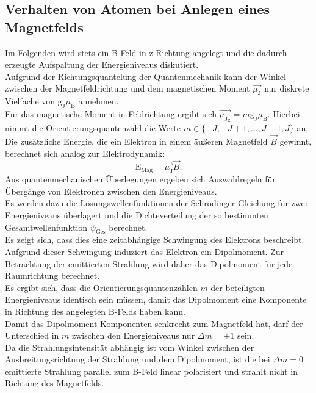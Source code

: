 \subsection{Verhalten von Atomen bei Anlegen eines Magnetfelds}
Im Folgenden wird stets ein B-Feld in z-Richtung angelegt und die dadurch erzeugte Aufspaltung der Energieniveaus diskutiert.\\
Aufgrund der Richtungsquantelung der Quantenmechanik kann der Winkel zwischen der Magnetfeldrichtung und dem magnetischen Moment $\vec{\mu_{\mathrm{J}}}$ nur diskrete Vielfache von $\mathrm{g_J}\mu_{\mathrm{B}}$ annehmen.\\ Für das magnetische Moment in Feldrichtung ergibt sich $\vec{\mu_{\mathrm{J_Z}}}=m\mathrm{g_J}\mu_{\mathrm{B}}$. Hierbei nimmt die Orientierungsquantenzahl die Werte $m \in \{-J, -J + 1, ...,J-1, J\}$ an.\\
Die zusätzliche Energie, die ein Elektron in einem äußeren Magnetfeld $\vec{B}$ gewinnt, berechnet sich analog zur Elektrodynamik:
\begin{equation}
  \label{eqn:Emag}
  \mathrm{E_{Mag}}=\vec{\mu_{\mathrm{J}}}\vec{B}\mathrm{.}
\end{equation}
Aus quantenmechanischen Überlegungen ergeben sich Auswahlregeln für Übergänge von Elektronen zwischen den Energieniveaus.\\
Es werden dazu die Lösungswellenfunktionen der Schrödinger-Gleichung für zwei Energieniveaus überlagert und die Dichteverteilung der so bestimmten Gesamtwellenfunktion $\psi_{\mathrm{Ges}}$ berechnet. \\
Es zeigt sich, dass dies eine zeitabhängige Schwingung des Elektrons beschreibt.\\
Aufgrund dieser Schwingung induziert das Elektron ein Dipolmoment.
Zur Betrachtung der emittierten Strahlung wird daher das Dipolmoment für jede Raumrichtung berechnet.\\
Es ergibt sich, dass die Orientierungsquantenzahlen $m$ der beteiligten Energieniveaus identisch sein müssen, damit das Dipolmoment eine Komponente in Richtung des angelegten B-Felds haben kann.\\
Damit das Dipolmoment Komponenten senkrecht zum Magnetfeld hat, darf der Unterschied in $m$ zwischen den Energieniveaus nur $\Delta m=\pm 1$ sein.\\
Da die Strahlungsintensität abhängig ist vom Winkel zwischen der Ausbreitungsrichtung der Strahlung und dem Dipolmoment, ist die bei $\Delta m=0$ emittierte Strahlung parallel zum B-Feld linear polarisiert und strahlt nicht in Richtung des Magnetfelds.\\
